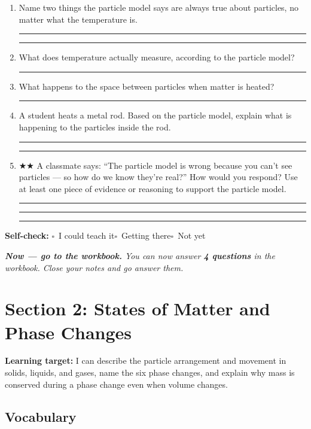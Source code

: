 \documentclass[11pt, a4paper]{article}
\newcommand{\answerline}{\par\vspace{0.45cm}\noindent\rule{\linewidth}{0.4pt}\par\vspace{0.1cm}}
\newcommand{\selfcheck}{\par\smallskip\noindent\textbf{Self-check:}
  $\square$~I could teach it\quad$\square$~Getting there\quad$\square$~Not yet\smallskip}
\begin{document}
\begin{tcolorbox}[retrieval]
\begin{enumerate}
  \item Name two things the particle model says are always true about particles, no matter what the temperature is.
  \answerline\answerline

  \item What does temperature actually measure, according to the particle model?
  \answerline

  \item What happens to the space between particles when matter is heated?
  \answerline

  \item A student heats a metal rod. Based on the particle model, explain what is happening to the particles inside the rod.
  \answerline\answerline

  \item $\bigstar\bigstar$ A classmate says: ``The particle model is wrong because you can't see particles --- so how do we know they're real?'' How would you respond? Use at least one piece of evidence or reasoning to support the particle model.
  \answerline\answerline\answerline
\end{enumerate}
\end{tcolorbox}

\selfcheck

\smallskip
\noindent\textit{\textbf{Now --- go to the workbook.} You can now answer \textbf{4 questions} in the workbook. Close your notes and go answer them.}

\clearpage

\section{Section 2: States of Matter and Phase Changes}

\begin{tcolorbox}[learningtarget]
\textbf{Learning target:} I can describe the particle arrangement and movement in solids, liquids, and gases, name the six phase changes, and explain why mass is conserved during a phase change even when volume changes.
\end{tcolorbox}

\subsection{Vocabulary}
\end{document}
